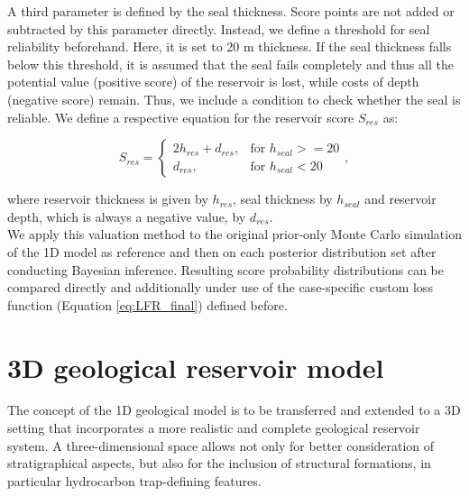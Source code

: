 	        A third parameter is defined by the seal thickness. Score points are not added or subtracted by this parameter directly. Instead, we define a threshold for seal reliability beforehand. Here, it is set to 20 m thickness. If the seal thickness falls below this threshold, it is assumed that the seal fails completely and thus all the potential value (positive score) of the reservoir is lost, while costs of depth (negative score) remain. Thus, we include a condition to check whether the seal is reliable. We define a respective equation for the reservoir score $S_{res}$ as:
			
			\begin{equation}\label{eq:1D_score_system}
			S_{res} = 
			\begin{cases}
			2h_{res} + d_{res}, & \text{for } h_{seal} >= 20  \\
			d_{res}, & \text{for } h_{seal} < 20
			\end{cases},
			\end{equation}
			
			where reservoir thickness is given by $h_{res}$, seal thickness by $h_{seal}$ and reservoir depth, which is always a negative value, by $d_{res}$.\\
			We apply this valuation method to the original prior-only Monte Carlo simulation of the 1D model as reference and then on each posterior distribution set after conducting Bayesian inference. Resulting score probability distributions can be compared directly and additionally under use of the case-specific custom loss function (Equation \ref{eq:LFR_final}) defined before. 
		
		\section{3D geological reservoir model}\label{sec:3D_model}
		The concept of the 1D geological model is to be transferred and extended to a 3D setting that incorporates a more realistic and complete geological reservoir system. A three-dimensional space allows not only for better consideration of stratigraphical aspects, but also for the inclusion of structural formations, in particular hydrocarbon trap-defining features.
		
